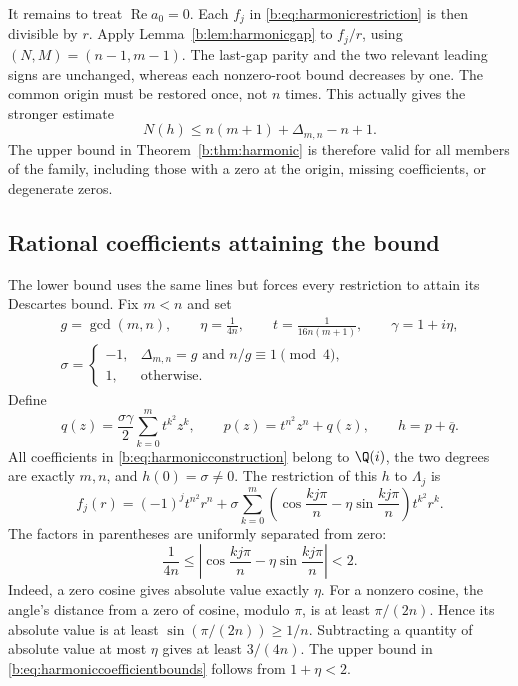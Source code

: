 \documentclass[UTF8,11pt]{ctexart}
\theoremstyle{definition}
\numberwithin{equation}{section}
\DeclareMathOperator{\Rea}{Re}\DeclareMathOperator{\Ima}{Im}
\begin{document}
It remains to treat $\Rea a_0=0$. Each $f_j$ in
\eqref{b:eq:harmonicrestriction} is then divisible by $r$.
Apply Lemma~\ref{b:lem:harmonicgap} to $f_j/r$, using
$(N,M)=(n-1,m-1)$. The last-gap parity and the two relevant leading
signs are unchanged, whereas each nonzero-root bound decreases by
one. The common origin must be restored once, not $n$ times. This
actually gives the stronger estimate
\[
 N(h)\le n(m+1)+\Delta_{m,n}-n+1.
\]
The upper bound in Theorem~\ref{b:thm:harmonic} is therefore valid for
all members of the family, including those with a zero at the
origin, missing coefficients, or degenerate zeros.

\subsection{Rational coefficients attaining the bound}
The lower bound uses the same lines but forces every restriction to
attain its Descartes bound. Fix $m<n$ and set
\begin{equation}\label{b:eq:harmonicparameters}
 \begin{gathered}
 g=\gcd(m,n),\qquad \eta=\frac1{4n},\qquad
 t=\frac1{16n(m+1)},\qquad \gamma=1+i\eta,\\
 \sigma=
 \begin{cases}
 -1,&\Delta_{m,n}=g\text{ and }n/g\equiv1\pmod4,\\
 1,&\text{otherwise}.
 \end{cases}
 \end{gathered}
\end{equation}
Define
\begin{equation}\label{b:eq:harmonicconstruction}
 q(z)=\frac{\sigma\gamma}{2}\sum_{k=0}^m t^{k^2}z^k,
 \qquad p(z)=t^{n^2}z^n+q(z),\qquad h=p+\overline q.
\end{equation}
All coefficients in \eqref{b:eq:harmonicconstruction} belong to
$\Q(i)$, the two degrees are exactly $m,n$, and $h(0)=\sigma\ne0$.
The restriction of this $h$ to $\Lambda_j$ is
\begin{equation}\label{b:eq:harmonicexplicitline}
 f_j(r)=(-1)^jt^{n^2}r^n+
 \sigma\sum_{k=0}^m
 \left(\cos\frac{kj\pi}{n}-\eta\sin\frac{kj\pi}{n}\right)
 t^{k^2}r^k.
\end{equation}
The factors in parentheses are uniformly separated from zero:
\begin{equation}\label{b:eq:harmoniccoefficientbounds}
 \frac1{4n}\le
 \left|\cos\frac{kj\pi}{n}-\eta\sin\frac{kj\pi}{n}\right|<2.
\end{equation}
Indeed, a zero cosine gives absolute value exactly $\eta$.
For a nonzero cosine, the angle's distance from a zero of cosine,
modulo $\pi$, is at least $\pi/(2n)$. Hence its absolute value is
at least $\sin(\pi/(2n))\ge1/n$. Subtracting a quantity of absolute
value at most $\eta$ gives at least $3/(4n)$. The upper bound in
\eqref{b:eq:harmoniccoefficientbounds} follows from $1+\eta<2$.
\end{document}
